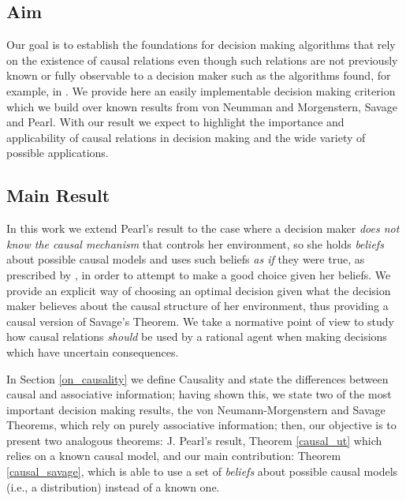 \documentclass{svjour3}                     %
\begin{document}
\subsection{Aim}
Our goal is to establish the foundations for decision making algorithms that rely on the existence of causal relations even though such relations are not previously known or fully observable to a decision maker such as the algorithms found, for example, in \citep{bareinboim2015bandits,lattimoreNIPS2016,sen2017identifying, gonzalez2018playing}. We provide here an easily implementable decision making criterion which we build over known results from von Neumman and Morgenstern, Savage and Pearl. With our result we expect to highlight the importance and applicability of causal relations in decision making and the wide variety of possible applications.

\subsection{Main Result}
In this work we extend Pearl's result to the case where a decision maker \textit{does not know the causal mechanism} that controls her environment, so she holds \textit{beliefs} about possible causal models and uses such beliefs \textit{as if} they were true, as prescribed by \cite{joyce1999foundations}, in order to attempt to make a good choice given her beliefs. We provide an explicit way of choosing an optimal decision given what the decision maker believes about the causal structure of her environment, thus providing a causal version of Savage's Theorem. We take a normative point of view to study how causal relations \textit{should} be used by a rational agent when making decisions which have uncertain consequences. 

In Section \ref{on_causality} we define Causality and state the differences between causal and associative information; having shown this, we state two of the most important decision making results, the von Neumann-Morgenstern and Savage Theorems, which rely on purely associative information; then, our objective is to present two analogous theorems: J. Pearl's result, Theorem \ref{causal_ut} which relies on a known causal model, and our main contribution: Theorem \ref{causal_savage}, which is able to use a set of \textit{beliefs} about possible causal models (i.e., a distribution) instead of a known one.
\end{document}
